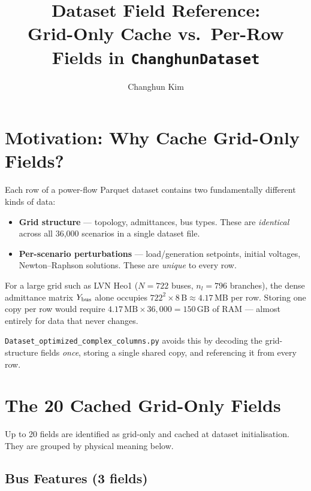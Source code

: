\documentclass{article}
\title{Dataset Field Reference:\\
  Grid-Only Cache vs.\ Per-Row Fields in \texttt{ChanghunDataset}}
\author{Changhun Kim}
\begin{document}
\maketitle

\section{Motivation: Why Cache Grid-Only Fields?}

Each row of a power-flow Parquet dataset contains two fundamentally
different kinds of data:

\begin{itemize}[noitemsep]
  \item \textbf{Grid structure} — topology, admittances, bus types.
    These are \emph{identical} across all 36{,}000 scenarios in a single
    dataset file.
  \item \textbf{Per-scenario perturbations} — load/generation setpoints,
    initial voltages, Newton--Raphson solutions.
    These are \emph{unique} to every row.
\end{itemize}

For a large grid such as LVN Heo1 ($N=722$ buses, $n_l=796$ branches),
the dense admittance matrix $Y_{\rm bus}$ alone occupies $722^2 \times
8\,\mathrm{B} \approx 4.17\,\mathrm{MB}$ per row.  Storing one copy per
row would require $4.17\,\mathrm{MB} \times 36{,}000 = 150\,\mathrm{GB}$
of RAM --- almost entirely for data that never changes.

\texttt{Dataset\_optimized\_complex\_columns.py} avoids this by decoding
the grid-structure fields \emph{once}, storing a single shared copy, and
referencing it from every row.

\section{The 20 Cached Grid-Only Fields}

Up to 20 fields are identified as grid-only and cached at dataset
initialisation.  They are grouped by physical meaning below.

\subsection{Bus Features (3 fields)}
\end{document}
